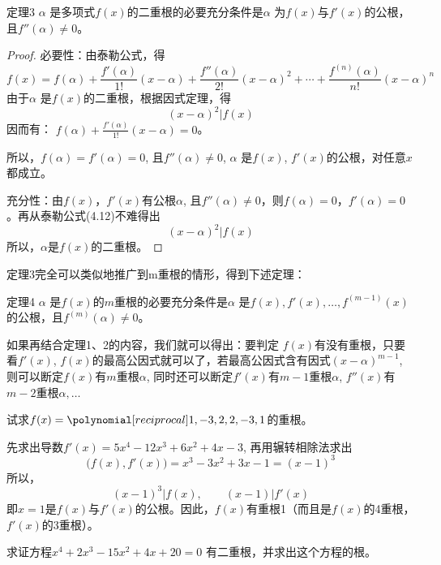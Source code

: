 \begin{blk}{定理3}
    $\alpha$ 是多项式$f(x)$的二重根的必要充分条件是$\alpha$ 为$f(x)$与$f'(x)$的公根，且$f''(\alpha )\ne 0$。
\end{blk}

\begin{proof}
    必要性：由泰勒公式，得
\begin{equation}
    f(x)=f(\alpha)+\frac{f'(\alpha)}{1!}(x-\alpha)+\frac{f''(\alpha)}{2!}(x-\alpha)^2+\cdots+\frac{f^{(n)}(\alpha)}{n!}(x-\alpha)^n
\end{equation}
由于$\alpha$ 是$f(x)$的二重根，根据因式定理，得
\[(x-\alpha )^2|f (x) \]
因而有：
$f (\alpha ) +\frac{f' (\alpha )}{1!} (x-\alpha )=0$。

所以，$f(\alpha )=f'(\alpha )=0$, 且$f''(\alpha )\ne 0$, $\alpha$ 是$f(x)$, $f'(x)$的公根，对任意$x$都成立。

充分性：由$f(x)$，$f'(x)$有公根$\alpha$, 且$f''(\alpha )\ne 0$，则$f(\alpha)= 0$，$f'(\alpha)=0$。再从泰勒公式(4.12)不难得出
\[(x-\alpha )^2|f (x) \]
所以，$\alpha$是$f(x)$的二重根。
\end{proof}

定理3完全可以类似地推广到m重根的情形，得到下述定理：

\begin{blk}{定理4}
    $\alpha$ 是$f(x)$的$m$重根的必要充分条件是$\alpha$ 是$f(x),f'(x),\ldots,f^{(m-1)}(x)$的公根，且$f^{(m)}(\alpha )\ne 0$。
\end{blk}

如果再结合定理1、2的内容，我们就可以得出：要判定
$f(x)$有没有重根，只要看$f'(x)$, $f(x)$的最高公因式就可以了，若最高公因式含有因式$(x-\alpha )^{m-1}$, 则可以断定$f(x)$有$m$重根$\alpha$, 同时还可以断定$f'(x)$有$m-1$重根$\alpha$, $f''(x)$有$m-2$重根$\alpha,\ldots$


\begin{example}
    试求$f(x)=\poly{1,-3,2,2,-3,1}$的重根。
\end{example}

\begin{solution}
    先求出导数$f' (x) =5x^4-12x^3+6x^2+4x-3$,
再用辗转相除法求出
\[\big(f (x) ,f' (x) \big) =x^3-3x^2+3x-1= (x-1)^3\]
所以，
\[(x-1)^3|f(x),\qquad (x-1)|f'(x)\]
即$x=1$是$f(x)$与$f'(x)$的公根。因此，$f(x)$有重根1（而且是$f(x)$的4重根，$f'(x)$的3重根）。
\end{solution}

\begin{example}
  求证方程$x^4+2x^3-15x^2+4x+20=0$
有二重根，并求出这个方程的根。  
\end{example}

